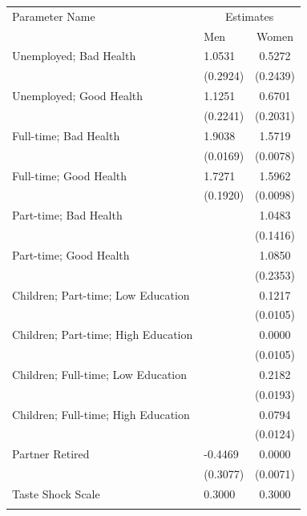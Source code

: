 \begin{tabular}{llc}
    \toprule
     Parameter Name  & \multicolumn{2}{c}{Estimates} \\
     {}              & {Men} &{Women}   \\
    \midrule
    Unemployed; Bad Health & 1.0531 & 0.5272 \\
    {} & (0.2924) & (0.2439) \\
    Unemployed; Good Health & 1.1251 & 0.6701 \\
    {} & (0.2241) & (0.2031) \\
    Full-time; Bad Health & 1.9038 & 1.5719 \\
    {} & (0.0169) & (0.0078) \\
    Full-time; Good Health & 1.7271 & 1.5962 \\
    {} & (0.1920) & (0.0098) \\
    Part-time; Bad Health & {} & 1.0483 \\
    {} & {} & (0.1416) \\
    Part-time; Good Health & {} & 1.0850 \\
    {} & {} & (0.2353) \\
    Children; Part-time; Low Education & {} & 0.1217 \\
    {} & {} & (0.0105) \\
    Children; Part-time; High Education & {} & 0.0000 \\
    {} & {} & (0.0105) \\
    Children; Full-time; Low Education & {} & 0.2182 \\
    {} & {} & (0.0193) \\
    Children; Full-time; High Education & {} & 0.0794 \\
    {} & {} & (0.0124) \\
    Partner Retired & -0.4469 & 0.0000 \\
    {} & (0.3077) & (0.0071) \\
    Taste Shock Scale & 0.3000 & 0.3000 \\
    {} &  &  \\
    \bottomrule
\end{tabular}

